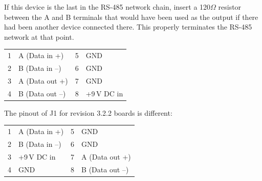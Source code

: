 If this device is the last in the RS-485 network chain, insert a 120$\Omega$ resistor between the A and B terminals
that would have been used as the output if there had been another device connected there. This properly terminates
the RS-485 network at that point.
\begin{center}
	\begin{tabular}{rl|rl}
		1&A (Data in +)    &5&GND\\
		2&B (Data in --)   &6&GND\\
		3&A (Data out +)   &7&GND\\
		4&B (Data out --)  &8&+9\,V DC in
	\end{tabular}
\end{center}

The pinout of J1 for revision 3.2.2 boards is different:
\begin{center}
	\begin{tabular}{rl|rl}
		1&A (Data in +)    &5&GND\\
		2&B (Data in --)   &6&GND\\
		3&+9\,V DC in      &7&A (Data out +)\\
		4&GND              &8&B (Data out --)\\
	\end{tabular}
\end{center}

